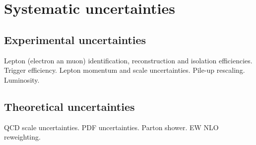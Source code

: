 \section{Systematic uncertainties}
\label{sec:sysuncert}

\subsection{Experimental uncertainties}

Lepton (electron an muon) identification, reconstruction and isolation efficiencies.
Trigger efficiency.
Lepton momentum and scale uncertainties.
Pile-up rescaling.
Luminosity.

\subsection{Theoretical uncertainties}
QCD scale uncertainties.
PDF uncertainties.
Parton shower.
EW NLO reweighting.